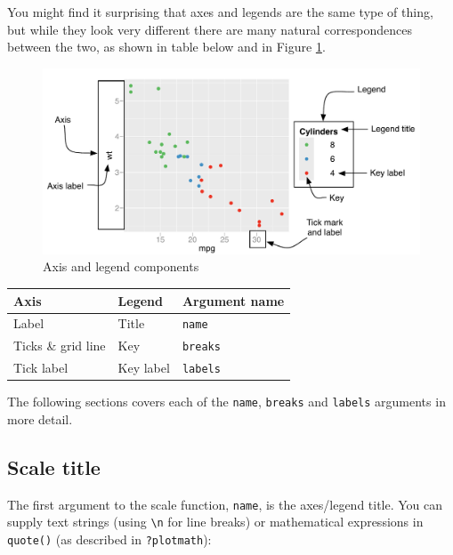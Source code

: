 You might find it surprising that axes and legends are the same type of
thing, but while they look very different there are many natural
correspondences between the two, as shown in table below and in Figure
\ref{fig:guides}.   

\begin{figure}[htbp]
  \centering
  \includegraphics[width=\linewidth]{diagrams/scale-guides.pdf}
  \caption{Axis and legend components}
  \label{fig:guides}
\end{figure}

\begin{longtable}[c]{@{}lll@{}}
\toprule
Axis & Legend & Argument name\tabularnewline
\midrule
\endhead
Label & Title & \texttt{name}\tabularnewline
Ticks \& grid line & Key & \texttt{breaks}\tabularnewline
Tick label & Key label & \texttt{labels}\tabularnewline
\bottomrule
\end{longtable}

The following sections covers each of the \texttt{name}, \texttt{breaks}
and \texttt{labels} arguments in more detail.

\subsection{Scale title}\label{scale-title}

The first argument to the scale function, \texttt{name}, is the
axes/legend title. You can supply text strings (using
\texttt{\textbackslash{}n} for line breaks) or mathematical expressions
in \texttt{quote()} (as described in \texttt{?plotmath}):
 

\begin{Shaded}
\begin{Highlighting}[]
\StringTok{ }\NormalTok{(} \NormalTok{:}\NormalTok{, } \NormalTok{, } \NormalTok{)}
\StringTok{ }\StringTok{ }\NormalTok{()}
\StringTok{ }\NormalTok{(}\NormalTok{)}
\StringTok{ }\NormalTok{(}\StringTok{ }\StringTok{ }
\end{Highlighting}
\end{Shaded}

